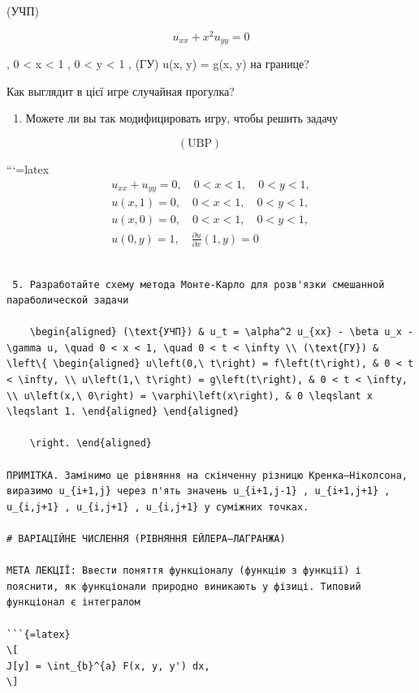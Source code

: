 \documentclass[
]{article}
\providecommand{\tightlist}{%
  \setlength{\itemsep}{0pt}\setlength{\parskip}{0pt}}
\begin{document}
(УЧП)

\[
u_{xx} + x^2 u_{yy} = 0
\]

, 0 \textless{} x \textless{} 1 , 0 \textless{} y \textless{} 1 , (ГУ)
u(x, y) = g(x, y) на границе?

Как выглядит в цієї игре случайная прогулка?

\begin{enumerate}
\def\labelenumi{\arabic{enumi}.}
\setcounter{enumi}{3}
\tightlist
\item
  Можете ли вы так модифицировать игру, чтобы решить задачу
\end{enumerate}

\[
(\text{UBP}) \qquad
\]

```{=latex}
\[
\begin{aligned} u_{xx} + u_{yy} = 0, \quad 0 < x < 1, \quad 0 < y < 1, \\ u(x, 1) = 0, \quad 0 < x < 1, \quad 0 < y < 1, \\ u(x, 0) = 0, \quad 0 < x < 1, \quad 0 < y < 1, \\ u(0, y) = 1, \quad \frac{\partial u}{\partial x}(1, y) = 0 \end{aligned}
\]

\begin{verbatim}

 5. Разработайте схему метода Монте-Карло для розв'язки смешанной параболической задачи

    \begin{aligned} (\text{УЧП}) & u_t = \alpha^2 u_{xx} - \beta u_x - \gamma u, \quad 0 < x < 1, \quad 0 < t < \infty \\ (\text{ГУ}) & \left\{ \begin{aligned} u\left(0,\ t\right) = f\left(t\right), & 0 < t < \infty, \\ u\left(1,\ t\right) = g\left(t\right), & 0 < t < \infty, \\ u\left(x,\ 0\right) = \varphi\left(x\right), & 0 \leqslant x \leqslant 1. \end{aligned} \end{aligned}

    \right. \end{aligned}

ПРИМІТКА. Замінимо це рівняння на скінченну різницю Кренка–Ніколсона, виразимо u_{i+1,j} через п'ять значень u_{i+1,j-1} , u_{i+1,j+1} , u_{i,j+1} , u_{i,j+1} , u_{i,j+1} у суміжних точках.

# ВАРІАЦІЙНЕ ЧИСЛЕННЯ (РІВНЯННЯ ЕЙЛЕРА–ЛАГРАНЖА)

МЕТА ЛЕКЦІЇ: Ввести поняття функціоналу (функцію з функції) і пояснити, як функціонали природно виникають у фізиці. Типовий функціонал є інтегралом

```{=latex}
\[
J[y] = \int_{b}^{a} F(x, y, y') dx,
\]
\end{verbatim}
\end{document}
